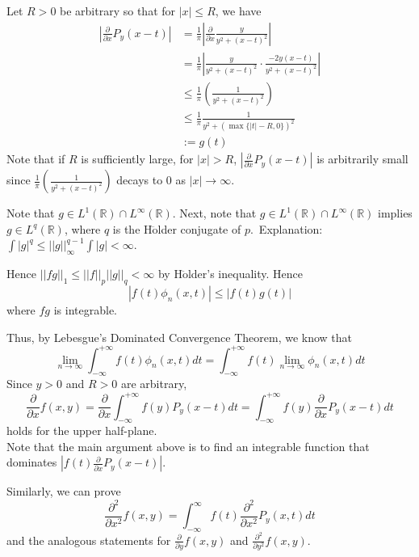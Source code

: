 \documentclass[a4paper,11pt]{article}
\begin{document}
\begin{enumerate}
		Let $R > 0$ be arbitrary so that for $|x| \leq R$, we have
			$$\begin{aligned}
			\left| \frac{\partial}{\partial x} P_y (x-t) \right|
			&= \frac{1}{\pi} \left| \frac{\partial}{\partial x} \frac{y}{y^2 + (x - t)^2} \right|\\
			&= \frac{1}{\pi} \left| \frac{y}{y^2 + (x - t)^2} \cdot \frac{-2y (x - t)}{y^2 + (x - t)^2} \right|\\
			&\leq \frac{1}{\pi} \left( \frac{1}{y^2 + (x-t)^2} \right)\\
			&\leq \frac{1}{\pi} \frac{1}{y^2 + (\max \{ |t|-R,0 \})^2}\\
			&:= g(t)
			\end{aligned}$$
		Note that if $R$ is sufficiently large, for $|x| > R$, $\left| \frac{\partial}{\partial x} P_y (x-t) \right|$ is arbitrarily small since $\frac{1}{\pi} \left( \frac{1}{y^2 + (x-t)^2} \right)$ decays to 0 as $|x| \to \infty$.\

		Note that $g \in L^1(\mathbb{R}) \cap L^\infty (\mathbb{R})$. Next, note that $g \in L^1 (\mathbb{R}) \cap L^\infty (\mathbb{R})$ implies $g \in L^q (\mathbb{R})$, where $q$ is the H$\ddot{\text{o}}$lder conjugate of $p$.\
		Explanation: $\int |g|^q \leq ||g||_\infty^{q-1} \int |g| < \infty$.\

		Hence $||fg||_1 \leq ||f||_p ||g||_q < \infty$ by H$\ddot{\text{o}}$lder's inequality. Hence
			$$|f(t) \phi_n (x,t)| \leq |f(t) g(t)|$$
		where $fg$ is integrable.\

		Thus, by Lebesgue's Dominated Convergence Theorem, we know that
			$$\underset{n \to \infty}{\lim} \int_{-\infty}^{+\infty} f(t) \phi_n(x,t) dt
			= \int_{-\infty}^{+\infty} f(t) \underset{n \to \infty}{\lim} \phi_n(x,t) dt$$
		Since $y > 0$ and $R > 0$ are arbitrary,
			$$\frac{\partial}{\partial x} f(x,y)
			= \frac{\partial}{\partial x} \int_{-\infty}^{+\infty} f(y) P_y (x - t) dt
			= \int_{-\infty}^{+\infty} f(y) \frac{\partial}{\partial x} P_y (x - t) dt$$
		holds for the upper half-plane.\\

		Note that the main argument above is to find an integrable function that dominates $\left| f(t) \frac{\partial}{\partial x} P_y (x-t) \right|$.\

		Similarly, we can prove
			$$\frac{\partial^2}{\partial x^2} f(x,y)
			= \int_{-\infty}^{\infty} f(t) \frac{\partial^2}{\partial x^2} P_y (x,t) dt$$
		and the analogous statements for $\frac{\partial}{\partial y} f(x,y)$ and $\frac{\partial^2}{\partial y^2} f(x,y)$.\


\end{enumerate}
\end{document}
